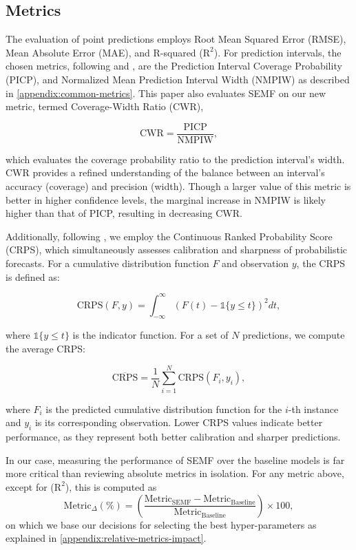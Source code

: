 \documentclass{article}
\begin{document}
\subsection{Metrics}
The evaluation of point predictions employs Root Mean Squared Error (RMSE), Mean Absolute Error (MAE), and R-squared ($\text{R}^2$). For prediction intervals, the chosen metrics, following \cite{pearce2018high} and \cite{zhou2023real}, are the Prediction Interval Coverage Probability (PICP), and Normalized Mean Prediction Interval Width (NMPIW) as described in \autoref{appendix:common-metrics}. This paper also evaluates SEMF on our new metric, termed Coverage-Width Ratio (CWR), 

\begin{equation}
    \text{CWR}=\frac{\text{PICP}}{\text{NMPIW}},
\end{equation}

which evaluates the coverage probability ratio to the prediction interval's width. CWR provides a refined understanding of the balance between an interval's accuracy (coverage) and precision (width). Though a larger value of this metric is better in higher confidence levels, the marginal increase in NMPIW is likely higher than that of PICP, resulting in decreasing CWR.

Additionally, following \cite{gneiting2007probabilistic}, we employ the Continuous Ranked Probability Score (CRPS), which simultaneously assesses calibration and sharpness of probabilistic forecasts. For a cumulative distribution function $F$ and observation $y$, the CRPS is defined as:

\begin{equation}
    \text{CRPS}(F,y) = \int_{-\infty}^{\infty} (F(t) - \mathds{1}\{y \leq t\})^2 dt,
\end{equation}

where $\mathds{1}\{y \leq t\}$ is the indicator function. For a set of $N$ predictions, we compute the average CRPS:

\begin{equation}
    \overline{\text{CRPS}} = \frac{1}{N}\sum_{i=1}^N \text{CRPS}(F_i,y_i),
\end{equation}

where $F_i$ is the predicted cumulative distribution function for the $i$-th instance and $y_i$ is its corresponding observation. Lower CRPS values indicate better performance, as they represent both better calibration and sharper predictions.

In our case, measuring the performance of SEMF over the baseline models is far more critical than reviewing absolute metrics in isolation. For any metric above, except for ($\text{R}^2$), this is computed as 
\small
\begin{equation}
\label{eqn:base_metric}
\text{Metric}_\Delta(\%) = \left( \frac{\text{Metric}_{\text{SEMF}} - \text{Metric}_{\text{Baseline}}}{\text{Metric}_{\text{Baseline}}} \right) \times 100 ,
\end{equation}
\normalsize
on which we base our decisions for selecting the best hyper-parameters as explained in \autoref{appendix:relative-metrics-impact}.
\end{document}
